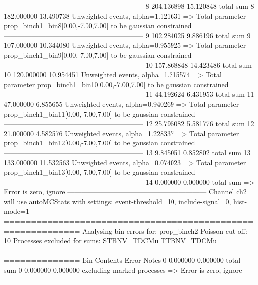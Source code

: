 ------------------------------------------------------------
8          204.136898      15.120848       total sum                     
8          182.000000      13.490738       Unweighted events, alpha=1.121631
  => Total parameter prop_binch1_bin8[0.00,-7.00,7.00] to be gaussian constrained
------------------------------------------------------------
9          102.284025      9.886196        total sum                     
9          107.000000      10.344080       Unweighted events, alpha=0.955925
  => Total parameter prop_binch1_bin9[0.00,-7.00,7.00] to be gaussian constrained
------------------------------------------------------------
10         157.868848      14.423486       total sum                     
10         120.000000      10.954451       Unweighted events, alpha=1.315574
  => Total parameter prop_binch1_bin10[0.00,-7.00,7.00] to be gaussian constrained
------------------------------------------------------------
11         44.192624       6.431953        total sum                     
11         47.000000       6.855655        Unweighted events, alpha=0.940269
  => Total parameter prop_binch1_bin11[0.00,-7.00,7.00] to be gaussian constrained
------------------------------------------------------------
12         25.795082       5.581776        total sum                     
12         21.000000       4.582576        Unweighted events, alpha=1.228337
  => Total parameter prop_binch1_bin12[0.00,-7.00,7.00] to be gaussian constrained
------------------------------------------------------------
13         9.845051        0.852802        total sum                     
13         133.000000      11.532563       Unweighted events, alpha=0.074023
  => Total parameter prop_binch1_bin13[0.00,-7.00,7.00] to be gaussian constrained
------------------------------------------------------------
14         0.000000        0.000000        total sum                     
  => Error is zero, ignore      
------------------------------------------------------------
Channel ch2 will use autoMCStats with settings: event-threshold=10, include-signal=0, hist-mode=1
============================================================
Analysing bin errors for: prop_binch2
Poisson cut-off: 10
Processes excluded for sums: STBNV_TDCMu TTBNV_TDCMu
============================================================
Bin        Contents        Error           Notes                         
0          0.000000        0.000000        total sum                     
0          0.000000        0.000000        excluding marked processes    
  => Error is zero, ignore      
------------------------------------------------------------
